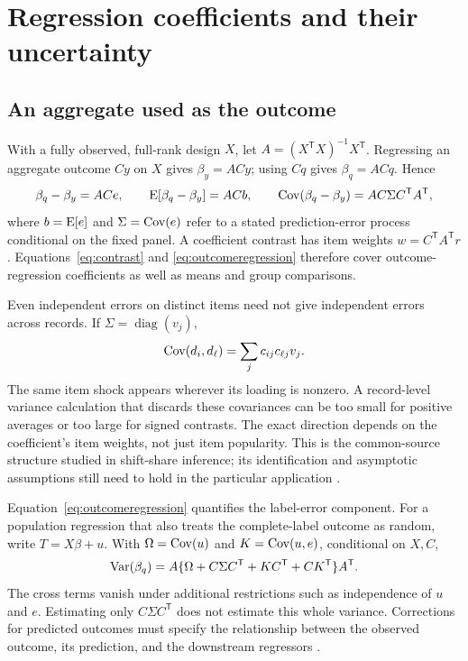 \section{Regression coefficients and their uncertainty}\label{sec:covariates}
\subsection{An aggregate used as the outcome}
With a fully observed, full-rank design $X$, let
$A=(X^{\mathsf T}X)^{-1}X^{\mathsf T}$. Regressing an aggregate outcome
$Cy$ on $X$ gives $\beta_y=ACy$; using $Cq$ gives $\beta_q=ACq$. Hence
\begin{equation}\label{eq:outcomeregression}
\beta_q-\beta_y=ACe,\qquad
\operatorname{E}[\beta_q-\beta_y]=ACb,\qquad
\operatorname{Cov}(\beta_q-\beta_y)=AC\Sigma C^{\mathsf T}A^{\mathsf T},
\end{equation}
where $b=\operatorname{E}[e]$ and $\Sigma=\operatorname{Cov}(e)$ refer to a stated prediction-error
process conditional on the fixed panel. A coefficient contrast has item
weights $w=C^{\mathsf T}A^{\mathsf T}r$. Equations~\eqref{eq:contrast} and
\eqref{eq:outcomeregression} therefore cover outcome-regression coefficients
as well as means and group comparisons.

Even independent errors on distinct items need not give independent errors
across records. If $\Sigma=\operatorname{diag}(v_j)$,
\begin{equation}\label{eq:mainreusecov}
\operatorname{Cov}(d_i,d_\ell)=\sum_jc_{ij}c_{\ell j}v_j.
\end{equation}
The same item shock appears wherever its loading is nonzero. A record-level
variance calculation that discards these covariances can be too small for
positive averages or too large for signed contrasts. The exact direction
depends on the coefficient's item weights, not just item popularity.
This is the common-source structure studied in shift-share inference;
its identification and asymptotic assumptions still need to hold in the
particular application \citep{adao2019,borusyak2022shiftshare}.

Equation~\eqref{eq:outcomeregression} quantifies the label-error component.
For a population regression that also treats the complete-label outcome as
random, write $T=X\beta+u$. With $\Omega=\operatorname{Cov}(u)$ and
$K=\operatorname{Cov}(u,e)$, conditional on $X,C$,
\begin{equation}\label{eq:combinedvariance}
\operatorname{Var}(\beta_q)=A\{\Omega+C\Sigma C^{\mathsf T}
                 +KC^{\mathsf T}+CK^{\mathsf T}\}A^{\mathsf T}.
\end{equation}
The cross terms vanish under additional restrictions such as independence
of $u$ and $e$. Estimating only $C\Sigma C^{\mathsf T}$ does not estimate
this whole variance. Corrections for predicted outcomes must specify the
relationship between the observed outcome, its prediction, and the downstream
regressors \citep{wang2020postprediction}.

